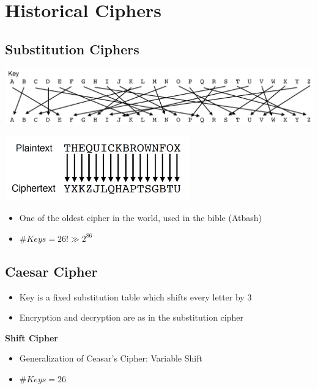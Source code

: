 

\chapter{Historical Ciphers}
    \section{Substitution Ciphers}
        \begin{center}
            \includegraphics[width=160mm]{Graphics/Historical Ciphers/SubstitutionCiphers1.png}\newline
        \end{center}
        \begin{center}
            \includegraphics[width=80mm]{Graphics/Historical Ciphers/SubstitutionCiphers2.png}\newline
        \end{center}
        \begin{itemize}
            \item One of the oldest cipher in the world, used in the bible (Atbash)
            \item $\#Keys = 26! \gg 2^{86}$
        \end{itemize}
    
    \section{Caesar Cipher}
        \begin{itemize}
            \item Key is a fixed substitution table which shifts every letter by 3
            \item Encryption and decryption are as in the substitution cipher
        \end{itemize}
        \textbf{Shift Cipher}
        \begin{itemize}
            \item Generalization of Ceasar's Cipher: Variable Shift
            \item $\#Keys = 26$
        \end{itemize}
     
